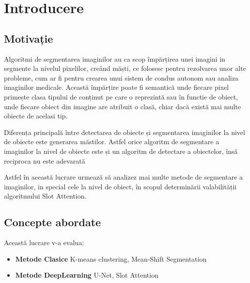 \section{Introducere}

\subsection{Motivație}

Algoritmi de segmentarea imaginilor au ca scop împărțirea unei imagini in segmente la nivelul pixelilor,
creând măști, ce folosesc pentru rezolvarea unor alte probleme, cum ar fi pentru crearea unui sistem de condus autonom
sau analiza imaginilor medicale.
Această împărțire poate fi semantică unde fiecare pixel primește clasa tipului de conținut pe care o reprezintă
sau în functie de obiect, unde fiecare obiect din imagine are atribuit o clasă, chiar dacă există mai multe obiecte de acelasi tip.


Diferența principală între detectarea de obiecte și segmentarea imaginilor la nivel de obiecte este generarea măstilor.
Astfel orice algoritm de segmentare a imaginilor la nivel de obiecte este și un algoritm de detectare a obiectelor, însă reciproca nu este adevarată


Astfel în această lucrare urmează să analizez mai multe metode de segmentare a imaginilor, in special cele la nivel de obiect, în scopul determinării valabilității algoritmului Slot Attention.

\subsection{Concepte abordate}

Această lucrare v-a evalua:

\begin{itemize}
  \item \textbf{Metode Clasice} K-means clustering, Mean-Shift Segmentation
  \item \textbf{Metode DeepLearning} U-Net, Slot Attention
\end{itemize}
